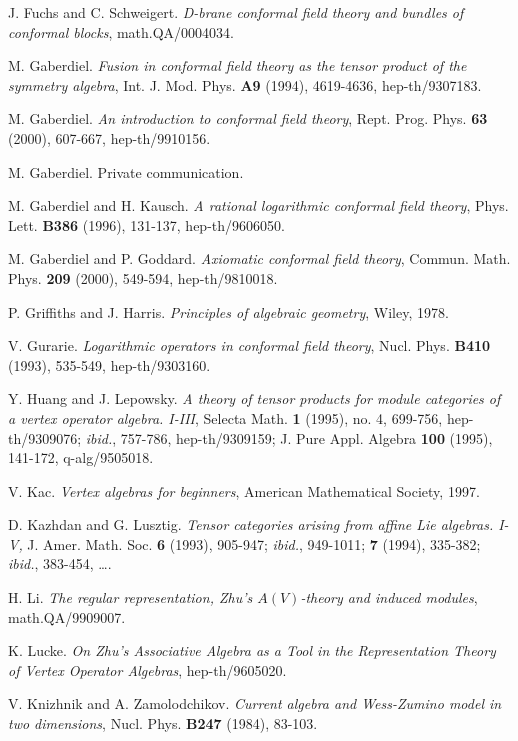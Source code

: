 \documentclass[a4paper,12pt]{article}
\newcommand{\ti}[1]{\textit{#1}}
\begin{document}
\begin{thebibliography}{99}
 J. Fuchs and C. Schweigert.  \ti{D-brane conformal field theory and bundles of conformal blocks}, math.QA/0004034.

 M. Gaberdiel.  \ti{Fusion in conformal field theory as the tensor product of the symmetry algebra}, Int. J. Mod. Phys. \textbf{A9} (1994), 4619-4636, hep-th/9307183.

 M. Gaberdiel.  \ti{An introduction to conformal field theory},
Rept. Prog. Phys. \textbf{63} (2000), 607-667, hep-th/9910156.

 M. Gaberdiel.  Private communication.

 M. Gaberdiel and H. Kausch.  \ti{A rational logarithmic conformal field theory}, Phys. Lett. \textbf{B386} (1996), 131-137, hep-th/9606050.

 M. Gaberdiel and P. Goddard.  \ti{Axiomatic conformal field theory}, Commun. Math. Phys. \textbf{209} (2000), 549-594, hep-th/9810018.

 P. Griffiths and J. Harris.  \ti{Principles of algebraic geometry}, Wiley, 1978.

 V. Gurarie.  \ti{Logarithmic operators in conformal field theory}, Nucl. Phys. \textbf{B410} (1993), 535-549, hep-th/9303160.

 Y. Huang and J. Lepowsky.  \ti{A theory of tensor products for module categories of a vertex operator algebra.  I-III},  Selecta Math. \textbf{1} (1995), no. 4, 699-756, hep-th/9309076; \ti{ibid.}, 757-786, hep-th/9309159; J. Pure Appl. Algebra \textbf{100} (1995), 141-172, q-alg/9505018.

 V. Kac.  \ti{Vertex algebras for beginners}, American Mathematical Society, 1997.

 D. Kazhdan and G. Lusztig.  \ti{Tensor categories arising from affine Lie algebras. I-V,} J. Amer. Math.
Soc. \textbf{6} (1993), 905-947; \ti{ibid.}, 949-1011; \textbf{7} (1994), 335-382; \ti{ibid.}, 383-454, \dots.

 H. Li.  \ti{The regular representation, Zhu's $A(V)$-theory and induced modules}, math.QA/9909007.

 K. Lucke.  \ti{On Zhu's Associative Algebra as a Tool in the Representation Theory of Vertex Operator Algebras}, hep-th/9605020.

 V. Knizhnik and A. Zamolodchikov.  \ti{Current algebra and Wess-Zumino model in two dimensions}, Nucl. Phys. \textbf{B247} (1984), 83-103.


\end{thebibliography}
\end{document}
